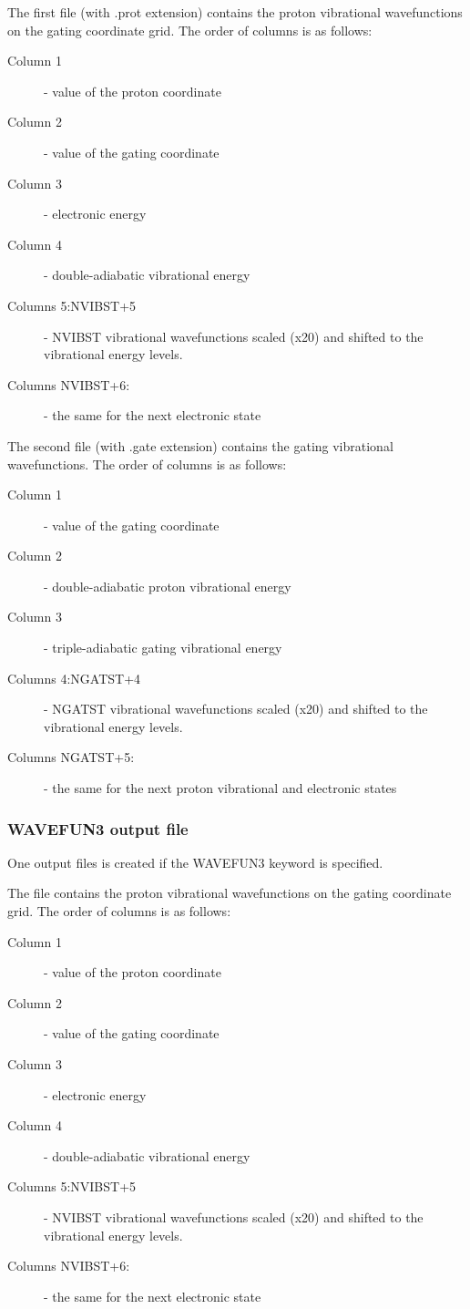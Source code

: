 \documentclass[oneside,11pt,openany]{book}
\newcommand{\tw}{\ttfamily}
\begin{document}
The first file (with {\tw .prot} extension) contains
the proton vibrational wavefunctions on the gating coordinate grid.
The order of columns is as follows:
\begin{description}
\item[Column 1] - value of the proton coordinate
\item[Column 2] - value of the gating coordinate
\item[Column 3] - electronic energy
\item[Column 4] - double-adiabatic vibrational energy
\item[Columns 5:{\tw NVIBST}+5] -  {\tw NVIBST} vibrational wavefunctions
scaled (x20) and shifted to the vibrational energy levels.
\item[Columns {\tw NVIBST}+6:] - the same for the next electronic state
\end{description}

The second file (with {\tw .gate} extension) contains
the gating vibrational wavefunctions.
The order of columns is as follows:
\begin{description}
\item[Column 1] - value of the gating coordinate
\item[Column 2] - double-adiabatic proton vibrational energy
\item[Column 3] - triple-adiabatic gating vibrational energy
\item[Columns 4:{\tw NGATST}+4] -  {\tw NGATST} vibrational wavefunctions
scaled (x20) and shifted to the vibrational energy levels.
\item[Columns {\tw NGATST}+5:] - the same for the next proton vibrational
 and electronic states
\end{description}

\subsubsection{WAVEFUN3 output file}
One output files is created if the {\tw WAVEFUN3} keyword is specified.

The file contains the proton vibrational wavefunctions
on the gating coordinate grid.
The order of columns is as follows:
\begin{description}
\item[Column 1] - value of the proton coordinate
\item[Column 2] - value of the gating coordinate
\item[Column 3] - electronic energy
\item[Column 4] - double-adiabatic vibrational energy
\item[Columns 5:{\tw NVIBST}+5] -  {\tw NVIBST} vibrational wavefunctions
scaled (x20) and shifted to the vibrational energy levels.
\item[Columns {\tw NVIBST}+6:] - the same for the next electronic state
\end{description}
\end{document}
